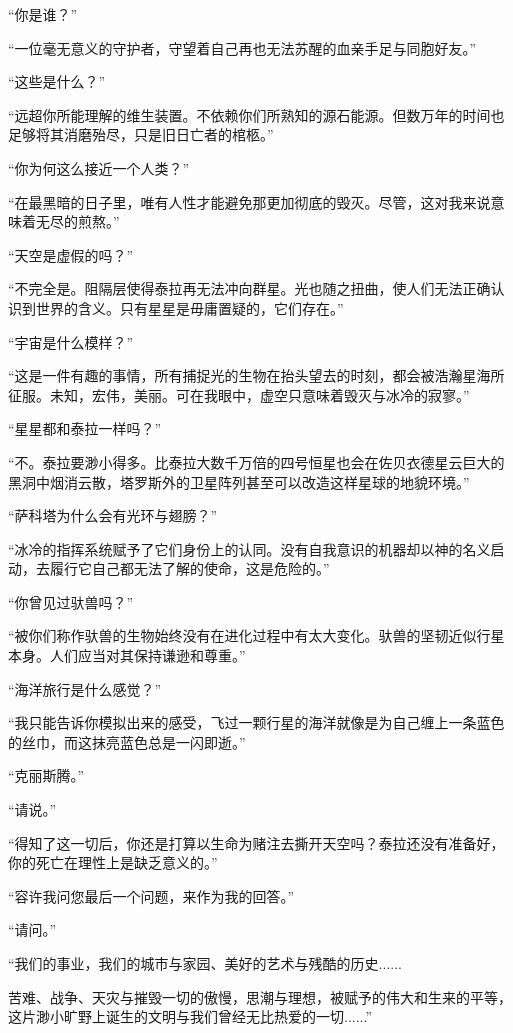 \documentclass[openany]{book}
\begin{document}
“你是谁？”\par
“一位毫无意义的守护者，守望着自己再也无法苏醒的血亲手足与同胞好友。”\par
“这些是什么？”\par
“远超你所能理解的维生装置。不依赖你们所熟知的源石能源。但数万年的时间也足够将其消磨殆尽，只是旧日亡者的棺柩。”\par
“你为何这么接近一个人类？”\par
“在最黑暗的日子里，唯有人性才能避免那更加彻底的毁灭。尽管，这对我来说意味着无尽的煎熬。”\par
“天空是虚假的吗？”\par
“不完全是。阻隔层使得泰拉再无法冲向群星。光也随之扭曲，使人们无法正确认识到世界的含义。只有星星是毋庸置疑的，它们存在。”\par
“宇宙是什么模样？”\par
“这是一件有趣的事情，所有捕捉光的生物在抬头望去的时刻，都会被浩瀚星海所征服。未知，宏伟，美丽。可在我眼中，虚空只意味着毁灭与冰冷的寂寥。”\par
“星星都和泰拉一样吗？”\par
“不。泰拉要渺小得多。比泰拉大数千万倍的四号恒星也会在佐贝衣德星云巨大的黑洞中烟消云散，塔罗斯外的卫星阵列甚至可以改造这样星球的地貌环境。”\par
“萨科塔为什么会有光环与翅膀？”\par
“冰冷的指挥系统赋予了它们身份上的认同。没有自我意识的机器却以神的名义启动，去履行它自己都无法了解的使命，这是危险的。”\par
“你曾见过驮兽吗？”\par
“被你们称作驮兽的生物始终没有在进化过程中有太大变化。驮兽的坚韧近似行星本身。人们应当对其保持谦逊和尊重。”\par
“海洋旅行是什么感觉？”\par
“我只能告诉你模拟出来的感受，飞过一颗行星的海洋就像是为自己缠上一条蓝色的丝巾，而这抹亮蓝色总是一闪即逝。”\par
“克丽斯腾。”\par
“请说。”\par
“得知了这一切后，你还是打算以生命为赌注去撕开天空吗？泰拉还没有准备好，你的死亡在理性上是缺乏意义的。”\par
“容许我问您最后一个问题，来作为我的回答。”\par
“请问。”\par
“我们的事业，我们的城市与家园、美好的艺术与残酷的历史......\par
苦难、战争、天灾与摧毁一切的傲慢，思潮与理想，被赋予的伟大和生来的平等，这片渺小旷野上诞生的文明与我们曾经无比热爱的一切......”
\clearpage
\end{document}
